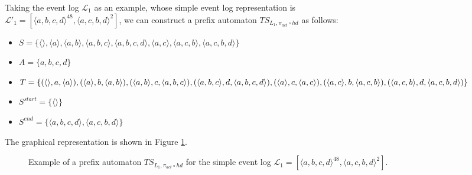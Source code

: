 Taking the event log $\mathcal{L}_1$ as an example, whose simple event log representation is \\ $\mathcal{L'}_1 = [ \langle a, b, c, d \rangle ^{48}, \langle a, c, b, d \rangle^2 ]$, we can construct a prefix automaton $\mathit{TS}_{L_1, \pi_{act} \circ hd}$ as follows:

\begin{itemize}
    \item $S = \{ \langle \rangle, \langle a \rangle, \langle a, b \rangle, \langle a, b, c \rangle, \langle a, b, c, d \rangle, \langle a, c \rangle, \langle a, c, b \rangle, \langle a, c, b, d \rangle \}$
    \item $A = \{ a, b, c, d \}$
    \item $T = \{ (\langle \rangle, a, \langle a \rangle), (\langle a \rangle, b, \langle a, b \rangle), (\langle a, b \rangle, c, \langle a, b, c \rangle), (\langle a, b, c \rangle, d, \langle a, b, c, d \rangle), \\ (\langle a \rangle, c, \langle a, c \rangle), (\langle a, c \rangle, b, \langle a, c, b \rangle), (\langle a, c, b \rangle, d, \langle a, c, b, d \rangle) \}$
    \item $S^{start} = \{ \langle \rangle \}$
    \item $S^{end} = \{ \langle a, b, c, d \rangle, \langle a, c, b, d \rangle \}$
\end{itemize}

The graphical representation is shown in Figure \ref{fig:example_prefix_automaton}.

\begin{figure}[H]
    \centering
    \caption{Example of a prefix automaton $\mathit{TS}_{L_1, \pi_{act} \circ hd}$ for the simple event log $\mathcal{L}_1 = [ \langle a, b, c, d \rangle ^{48}, \langle a, c, b, d \rangle^2 ]$.}
    \label{fig:example_prefix_automaton}
\end{figure}

